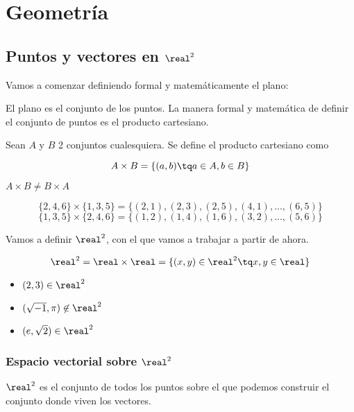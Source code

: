 \LARGE
\chapter{Geometría}

\section{Puntos y vectores en $\real^2$}

Vamos a comenzar definiendo formal y matemáticamente el plano:

El plano es el conjunto de los puntos. La manera formal y matemática de definir el conjunto de puntos es el producto cartesiano.

\begin{defn}
Sean $A$ y $B$ 2 conjuntos cualesquiera. Se define el producto cartesiano como

\[
	A\times B = \left\{ (a,b) \tq a \in A,b\in B \right\}
\]
\end{defn}

\obs $A\times B \neq B\times A$

\begin{example}
\[\{2,4,6\}\times \{1,3,5\} = \{(2,1),(2,3),(2,5),(4,1),...,(6,5)\}\]
\[\{1,3,5\}\times \{2,4,6\} = \{(1,2),(1,4),(1,6),(3,2),...,(5,6)\}\]
\end{example}

Vamos a definir $\real^2$, con el que vamos a trabajar a partir de ahora. 

\[\real^2 = \real\times\real = \{ (x,y)\in\real^2 \tq x,y\in\real\}\]

\begin{example}
	\begin{itemize}
		\item $(2,3)\in\real^2$
		\item $(\sqrt{-1},\pi)\not\in\real^2$
		\item $(e,\sqrt{2})\in\real^2$
	\end{itemize}
\end{example}


\subsection{Espacio vectorial sobre $\real^2$}

$\real^2$ es el conjunto de todos los puntos sobre el que podemos construir el conjunto donde viven los vectores.

